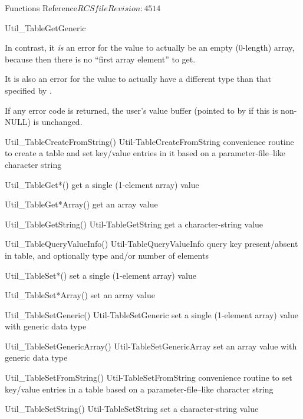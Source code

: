 \begin{cactuspart}{ Functions Reference}{$RCSfile$}{$Revision: 4514 $}
\begin{FunctionDescription}{Util\_TableGetGeneric}
\begin{Discussion}
In contrast, it {\em is\/} an error for the value to actually be an
empty (0-length) array, because then there is no ``first array element''
to get.

It is also an error for the value to actually have a different type
than that specified by .

If any error code is returned, the user's value buffer
(pointed to by  if this is non-NULL) is unchanged.
\end{Discussion}

\begin{SeeAlsoSection}
\begin{SeeAlso2} {Util\_TableCreateFromString()} {Util-TableCreateFromString}
convenience routine to create a table and set key/value entries
in it based on a parameter-file--like character string
\end{SeeAlso2}
\begin{SeeAlso}{Util\_TableGet*()}
get a single (1-element array) value
\end{SeeAlso}
\begin{SeeAlso}{Util\_TableGet*Array()}
get an array value
\end{SeeAlso}
\begin{SeeAlso2} {Util\_TableGetString()} {Util-TableGetString}
get a character-string value
\end{SeeAlso2}
\begin{SeeAlso2} {Util\_TableQueryValueInfo()} {Util-TableQueryValueInfo}
query key present/absent in table, and optionally type and/or number
of elements
\end{SeeAlso2}
\begin{SeeAlso}{Util\_TableSet*()}
set a single (1-element array) value
\end{SeeAlso}
\begin{SeeAlso}{Util\_TableSet*Array()}
set an array value
\end{SeeAlso}
\begin{SeeAlso2} {Util\_TableSetGeneric()} {Util-TableSetGeneric}
set a single (1-element array) value with generic data type
\end{SeeAlso2}
\begin{SeeAlso2} {Util\_TableSetGenericArray()} {Util-TableSetGenericArray}
set an array value with generic data type
\end{SeeAlso2}
\begin{SeeAlso2} {Util\_TableSetFromString()} {Util-TableSetFromString}
convenience routine to set key/value entries in a table based on a
parameter-file--like character string
\end{SeeAlso2}
\begin{SeeAlso2} {Util\_TableSetString()} {Util-TableSetString}
set a character-string value
\end{SeeAlso2}
\end{SeeAlsoSection}


\end{FunctionDescription}
\end{cactuspart}
